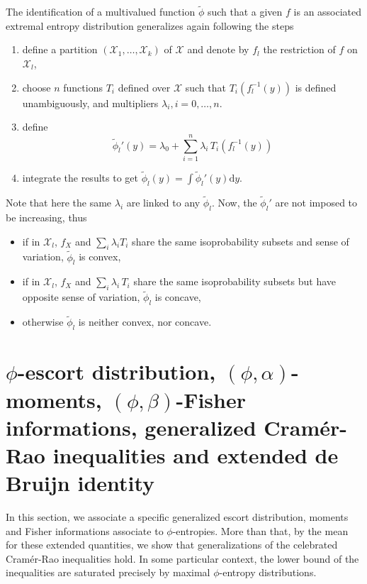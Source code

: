 \documentclass[english,sort&compress]{elsarticle}
\theoremstyle{definition}
\theoremstyle{plain}
\theoremstyle{plain}
\def\d{\mathrm{d}}
\def\X{\mathcal{X}}
\begin{document}
The  identification of  a multivalued  function $\widetilde{\phi}$  such  that a
given  $f$ is  an  associated extremal  entropy  distribution generalizes  again
following the steps
%
\begin{enumerate}
\item define  a partition $(\X_1,\ldots,\X_k)$ of  $\X$ and denote  by $f_l$ the
  restriction of $f$ on $\X_l$,
\item choose $n$ functions $T_i$  defined over $\X$ such that $T_i(f_l^{-1}(y))$
  is defined unambiguously, and multipliers $\lambda_i, i=0,\ldots,n$.
\item define
  \begin{equation}\label{eq:derivative-phil-notconcave}
  \widetilde{\phi}_l'(y) = \lambda_0 + \sum_{i=1}^n \lambda_i \,
  T_i\!\left(f_l^{-1}(y)\right)
  \end{equation}
\item integrate the results  to get ${\displaystyle \widetilde{\phi}_l(y) = \int
    \widetilde{\phi}_l'(y)\d y}$.
\end{enumerate}
%
Note  that here  the same  $\lambda_i$ are  linked to  any $\widetilde{\phi}_l$.
Now, the $\widetilde{\phi}_l'$ are not imposed to be increasing, thus
%
\begin{itemize}
\item  if  in   $\X_l$,  $f_X$  and  $\sum_i  \lambda_i   T_i$  share  the  same
  isoprobability subsets and sense of variation, $\widetilde{\phi}_l$ is convex,
\item  if  in  $\X_l$, $f_X$  and  $\sum_i  \lambda_i  \,  T_i$ share  the  same
  isoprobability    subsets   but    have   opposite    sense    of   variation,
  $\widetilde{\phi}_l$ is concave,
\item otherwise $\widetilde{\phi}_l$ is neither convex, nor concave. 
\end{itemize}



\section{$\phi$-escort           distribution,          $(\phi,\alpha)$-moments,
  $(\phi,\beta)$-Fisher informations,  generalized Cram\'er-Rao inequalities and
  extended de Bruijn identity}
\label{sec:EscortCR}

In  this  section, we  associate  a  specific  generalized escort  distribution,
moments and Fisher informations  associate to $\phi$-entropies.  More than that,
by the  mean for these extended  quantities, we show that  generalizations of the
celebrated Cram\'er-Rao inequalities hold. In some particular context, the lower
bound  of the  inequalities are  saturated precisely  by  maximal $\phi$-entropy
distributions.
\end{document}
